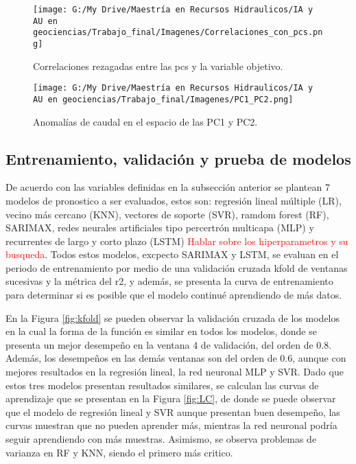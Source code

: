 \documentclass[draft]{agujournal2019}
\begin{document}
\begin{figure}[!]
	\centering%
	\texttt{[image: G:/My Drive/Maestría en Recursos Hidraulicos/IA y AU en geociencias/Trabajo\_final/Imagenes/Correlaciones\_con\_pcs.png]}
	\caption{Correlaciones rezagadas entre las pcs y la variable objetivo.} \label{fig:corr_pcs}
\end{figure}


\begin{figure}[!]
	\centering%
	\texttt{[image: G:/My Drive/Maestría en Recursos Hidraulicos/IA y AU en geociencias/Trabajo\_final/Imagenes/PC1\_PC2.png]}
	\caption{Anomalías de caudal en el espacio de las PC1 y PC2.} \label{fig:pc1pc2}
\end{figure}


\subsection{Entrenamiento, validación y prueba de modelos}

De acuerdo con las variables definidas en la subsección anterior se plantean 7 modelos de pronostico a ser evaluados, estos son: regresión lineal múltiple (LR), vecino más cercano (KNN), vectores de soporte (SVR), ramdom forest (RF), SARIMAX, redes neurales artificiales tipo percertrón multicapa (MLP) y recurrentes de largo y corto plazo (LSTM) \textcolor{red}{Hablar sobre los hiperparametros y su busqueda}. Todos estos modelos, excpecto SARIMAX y LSTM, se evaluan en el periodo de entrenamiento por medio de una validación cruzada kfold de ventanas sucesivas y la métrica del r2, y además, se presenta la curva de entrenamiento para determinar si es posible que el modelo continué aprendiendo de más datos. 

En la Figura \ref{fig:kfold} se pueden observar la validación cruzada de los modelos en la cual la forma de la función es similar en todos los modelos, donde se presenta un mejor desempeño en la ventana 4 de validación, del orden de 0.8. Además, los desempeños en las demás ventanas son del orden de 0.6, aunque con mejores resultados en la regresión lineal, la red neuronal MLP y SVR. Dado que estos tres modelos presentan resultados similares, se calculan las curvas de aprendizaje que se presentan en la Figura \ref{fig:LC}, de donde se puede observar que el modelo de regresión lineal y SVR aunque presentan buen desempeño, las curvas muestran que no pueden aprender más, mientras la red neuronal podría seguir aprendiendo con más muestras. Asimismo, se observa problemas de varianza en RF y KNN, siendo el primero más critico.
\end{document}
